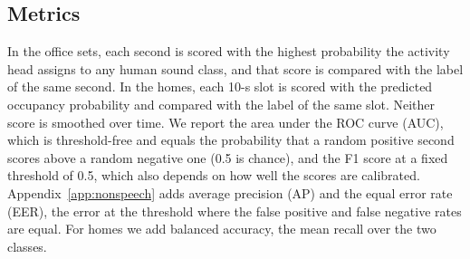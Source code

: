 \documentclass[11pt]{article}
\begin{document}
\subsection{Metrics}
\label{sec:metrics}
In the office sets, each second is scored with the highest probability the activity head assigns to any human sound class, and that score is compared with the label of the same second. In the homes, each 10-s slot is scored with the predicted occupancy probability and compared with the label of the same slot. Neither score is smoothed over time. We report the area under the ROC curve (AUC), which is threshold-free and equals the probability that a random positive second scores above a random negative one (0.5 is chance), and the F1 score at a fixed threshold of 0.5, which also depends on how well the scores are calibrated. Appendix~\ref{app:nonspeech} adds average precision (AP) and the equal error rate (EER), the error at the threshold where the false positive and false negative rates are equal. For homes we add balanced accuracy, the mean recall over the two classes.
\end{document}
